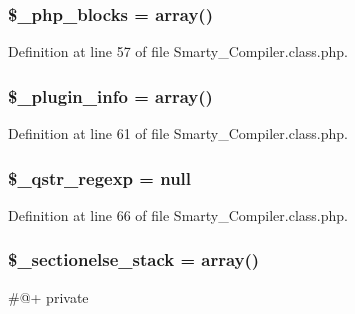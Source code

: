 \hypertarget{class_smarty___compiler_a1f04719e4f33024363b33fc5cf7f76d7}{
\subsubsection[{\$\-\_\-php\-\_\-blocks}]{\setlength{\rightskip}{0pt plus 5cm}\$\-\_\-php\-\_\-blocks = array()}}\label{class_smarty___compiler_a1f04719e4f33024363b33fc5cf7f76d7}


\-Definition at line 57 of file \-Smarty\-\_\-\-Compiler.\-class.\-php.

\hypertarget{class_smarty___compiler_a9adea7e6332e251373f97475a608f449}{
\subsubsection[{\$\-\_\-plugin\-\_\-info}]{\setlength{\rightskip}{0pt plus 5cm}\$\-\_\-plugin\-\_\-info = array()}}\label{class_smarty___compiler_a9adea7e6332e251373f97475a608f449}


\-Definition at line 61 of file \-Smarty\-\_\-\-Compiler.\-class.\-php.

\hypertarget{class_smarty___compiler_ada192075f87a21c4a276434572032dc5}{
\subsubsection[{\$\-\_\-qstr\-\_\-regexp}]{\setlength{\rightskip}{0pt plus 5cm}\$\-\_\-qstr\-\_\-regexp = null}}\label{class_smarty___compiler_ada192075f87a21c4a276434572032dc5}


\-Definition at line 66 of file \-Smarty\-\_\-\-Compiler.\-class.\-php.

\hypertarget{class_smarty___compiler_afbea38edc660342d33a2d2116e62237a}{
\subsubsection[{\$\-\_\-sectionelse\-\_\-stack}]{\setlength{\rightskip}{0pt plus 5cm}\$\-\_\-sectionelse\-\_\-stack = array()}}\label{class_smarty___compiler_afbea38edc660342d33a2d2116e62237a}
\#@+  private 

